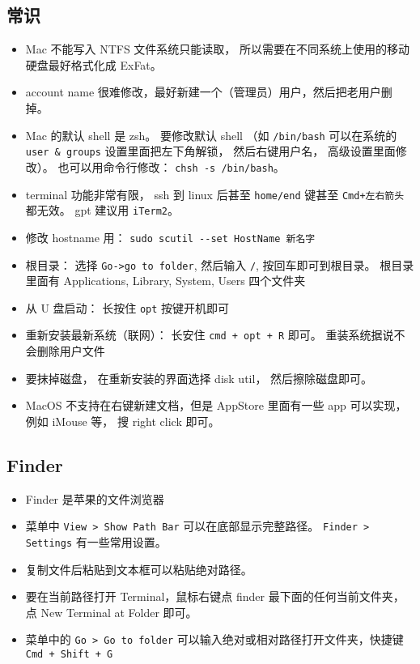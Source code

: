 \subsection{常识}
\begin{itemize}
\item Mac 不能写入 NTFS 文件系统只能读取， 所以需要在不同系统上使用的移动硬盘最好格式化成 ExFat。
\item account name 很难修改，最好新建一个（管理员）用户，然后把老用户删掉。
\item Mac 的默认 shell 是 zsh。 要修改默认 shell （如 \verb|/bin/bash| 可以在系统的 \verb|user & groups| 设置里面把左下角解锁， 然后右键用户名， 高级设置里面修改）。 也可以用命令行修改： \verb|chsh -s /bin/bash|。
\item terminal 功能非常有限， ssh 到 linux 后甚至 \verb|home/end| 键甚至 \verb|Cmd+左右箭头| 都无效。 gpt 建议用 \verb|iTerm2|。
\item 修改 hostname 用： \verb|sudo scutil --set HostName 新名字|
\item 根目录： 选择 \verb|Go->go to folder|, 然后输入 \verb|/|, 按回车即可到根目录。 根目录里面有 Applications, Library, System, Users 四个文件夹
\item 从 U 盘启动： 长按住 \verb`opt` 按键开机即可
\item 重新安装最新系统（联网）： 长安住 \verb|cmd + opt + R| 即可。 重装系统据说不会删除用户文件
\item 要抹掉磁盘， 在重新安装的界面选择 disk util， 然后擦除磁盘即可。
\item MacOS 不支持在右键新建文档，但是 AppStore 里面有一些 app 可以实现， 例如 iMouse 等， 搜 right click 即可。
\end{itemize}

\subsection{Finder}
\begin{itemize}
\item Finder 是苹果的文件浏览器
\item 菜单中 \verb|View > Show Path Bar| 可以在底部显示完整路径。 \verb`Finder > Settings` 有一些常用设置。
\item 复制文件后粘贴到文本框可以粘贴绝对路径。
\item 要在当前路径打开 Terminal，鼠标右键点 finder 最下面的任何当前文件夹，点 New Terminal at Folder 即可。
\item 菜单中的 \verb`Go > Go to folder` 可以输入绝对或相对路径打开文件夹，快捷键 \verb`Cmd + Shift + G`
\end{itemize}

